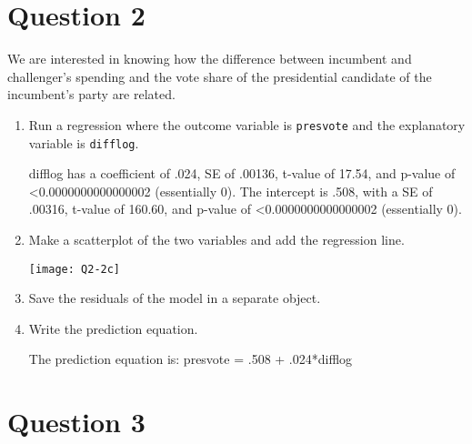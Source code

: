 \documentclass[12pt,letterpaper]{article}
\begin{document}
\section*{Question 2}%
\noindent We are interested in knowing how the difference between incumbent and challenger's spending and the vote share of the presidential candidate of the incumbent's party are related.	\vspace{.25cm}
	\begin{enumerate}
		\item Run a regression where the outcome variable is \texttt{presvote} and the explanatory variable is \texttt{difflog}.	
		\vspace{.5cm}

		\vspace{.25cm}
difflog has a coefficient of .024, SE of .00136, t-value of 17.54, and p-value of \textless0.0000000000000002 (essentially 0).
The intercept is .508, with a SE of .00316, t-value of 160.60, and p-value of \textless0.0000000000000002 (essentially 0).
		\vspace{1cm}
		\item Make a scatterplot of the two variables and add the regression line.
		\vspace{.5cm}

		\vspace{.25cm}
\texttt{[image: Q2-2c]}	
		\vspace{1cm}
		\item Save the residuals of the model in a separate object.	
		\vspace{.5cm}
		
		\vspace{1cm}	
		\item Write the prediction equation.
			
The prediction equation is: presvote = .508 + .024*difflog		
		\vspace{1cm}	
	\end{enumerate}
	
	\newpage	
\section*{Question 3}%
\end{document}
